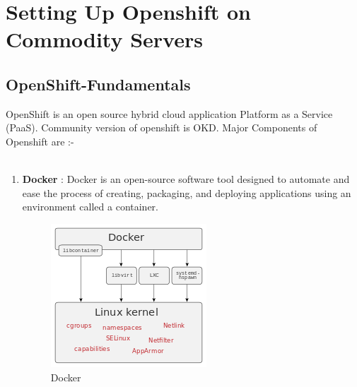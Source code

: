 \documentclass[11pt]{report}
\begin{document}
	\pagebreak
	\chapter{Setting Up Openshift on Commodity Servers}
	\section{OpenShift-Fundamentals}
	OpenShift is an open source hybrid cloud application Platform as a Service (PaaS). Community version of openshift is OKD. Major Components of Openshift are :- 
	\\
	\\
	\begin{enumerate}
		
		\item 
		\textbf{Docker} : Docker is an open-source software tool designed to automate and ease the process of creating, packaging, and deploying applications using an environment called a container.
		\\
	\begin{figure}[h!]
    	\begin{center}
    		\includegraphics[scale=0.7]{docker.png}
    		\caption{Docker \cite{Docker}}
    	  \end{center}
	  

\end{figure}
\end{enumerate}
\end{document}

